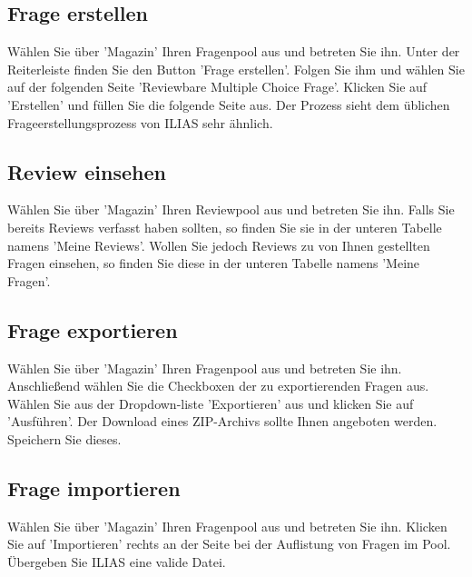 \documentclass[12pt,a4paper]{scrreprt}
\begin{document}
\subsection{Frage erstellen}
Wählen Sie über 'Magazin' Ihren Fragenpool aus und betreten Sie ihn. Unter der Reiterleiste finden Sie den Button 'Frage erstellen'. Folgen Sie ihm und wählen Sie auf der folgenden Seite 'Reviewbare Multiple Choice Frage'. Klicken Sie auf 'Erstellen' und füllen Sie die folgende Seite aus. Der Prozess sieht dem üblichen Frageerstellungsprozess von ILIAS sehr ähnlich. 
		
\subsection{Review einsehen}
Wählen Sie über 'Magazin' Ihren Reviewpool aus und betreten Sie ihn. Falls Sie bereits Reviews verfasst haben sollten, so finden Sie sie in der unteren Tabelle namens 'Meine Reviews'. Wollen Sie jedoch Reviews zu von Ihnen gestellten Fragen einsehen, so finden Sie diese in der unteren Tabelle namens 'Meine Fragen'.
		
\subsection{Frage exportieren}
Wählen Sie über 'Magazin' Ihren Fragenpool aus und betreten Sie ihn. Anschließend wählen Sie die Checkboxen der zu exportierenden Fragen aus. Wählen Sie aus der Dropdown-liste 'Exportieren' aus und klicken Sie auf 'Ausführen'. Der Download eines ZIP-Archivs sollte Ihnen angeboten werden. Speichern Sie dieses.
		
\subsection{Frage importieren}
Wählen Sie über 'Magazin' Ihren Fragenpool aus und betreten Sie ihn. Klicken Sie auf 'Importieren' rechts an der Seite bei der Auflistung von Fragen im Pool. Übergeben Sie ILIAS eine valide Datei. 
\end{document}
